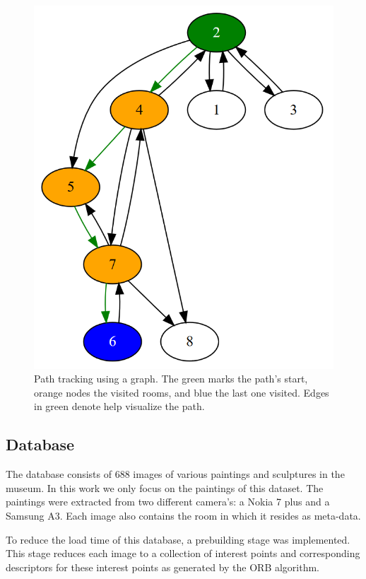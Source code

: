\documentclass[10pt,final,journal]{IEEEtran}
\begin{document}
	\begin{figure}
		\includegraphics[width=\linewidth]{groundplan_msk_simple_graph}
		\caption{Path tracking using a graph. The green marks the path's start, orange nodes the visited rooms, and blue the last one visited. Edges in green denote help visualize the path.}
		\label{fig:groundplan_msk_simple_graph}
	\end{figure}
	
	\subsection{Database}
	The database consists of 688 images of various paintings and sculptures in the museum. In this work we only focus on the paintings of this dataset. The paintings were extracted from two different camera's: a Nokia 7 plus and a Samsung A3. Each image also contains the room in which it resides as meta-data.  
	
	To reduce the load time of this database, a prebuilding stage was implemented. This stage reduces each image to a collection of interest points and corresponding descriptors for these interest points as generated by the ORB \cite{Rublee2011} algorithm. 
	
\end{document}
